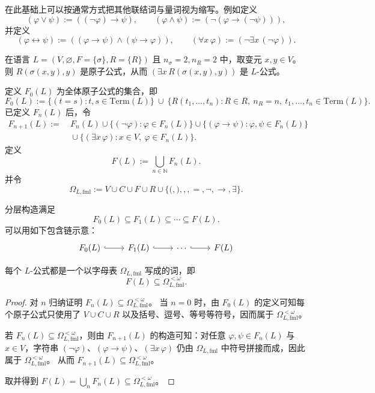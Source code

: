 \documentclass[lang=cn,a4paper,newtx,section]{elegantbook}
\begin{document}
\begin{remark}
在此基础上可以按通常方式把其他联结词与量词视为缩写。例如定义
\[
  (\varphi\vee\psi):=((\neg\varphi)\to\psi),\qquad (\varphi\wedge\psi):=(\neg(\varphi\to(\neg\psi))),
\]
并定义
\[
  (\varphi\leftrightarrow\psi):=((\varphi\to\psi)\wedge(\psi\to\varphi)),\qquad (\forall x\,\varphi):=(\neg\exists x\,(\neg\varphi)).
\]
\end{remark}

\begin{example}
在语言 $L=(V,\varnothing,F=\{\sigma\},R=\{R\})$ 且 $n_{\sigma}=2,n_R=2$ 中，取变元 $x,y\in V$。
则 $R(\sigma(x,y),y)$ 是原子公式，从而 $(\exists x\,R(\sigma(x,y),y))$ 是 $L$-公式。
\end{example}
 
 \begin{definition}[$F_n(L)$ 与 $F(L)$]
 定义 $F_0(L)$ 为全体原子公式的集合，即
 \[
   F_0(L):=\{(t=s): t,s\in\mathrm{Term}(L)\}\ \cup\ \{R(t_1,\dots,t_n): R\in R,\ n_R=n,\ t_1,\dots,t_n\in\mathrm{Term}(L)\}.
 \]
 已定义 $F_n(L)$ 后，令
 \[
   \begin{aligned}
   F_{n+1}(L):=&\ F_n(L)
   \cup\{(\neg\varphi):\varphi\in F_n(L)\}
   \cup\{(\varphi\to\psi):\varphi,\psi\in F_n(L)\}\\
   &\ \cup\{(\exists x\,\varphi): x\in V,\ \varphi\in F_n(L)\}.
   \end{aligned}
 \]
 定义
 \[
   F(L):=\bigcup_{n\in\mathbb N}F_n(L).
 \]
 并令
 \[
   \Omega_{L,\mathrm{fml}}:=V\cup C\cup F\cup R\cup\{\mathtt{(},\mathtt{)},\mathtt{,},\mathtt{=},\neg,\to,\exists\}.
 \]
 \end{definition}
 
 \begin{remark}
 分层构造满足
 \[
   F_0(L)\subseteq F_1(L)\subseteq\cdots\subseteq F(L).
 \]
 可以用如下包含链示意：
 \[
 \begin{tikzcd}
 F_0(L) \arrow[r, hook] & F_1(L) \arrow[r, hook] & \cdots \arrow[r, hook] & F(L)
 \end{tikzcd}
 \]
 \end{remark}
 
 \begin{lemma}
 每个 $L$-公式都是一个以字母表 $\Omega_{L,\mathrm{fml}}$ 写成的词，即
 \[
   F(L)\subseteq \Omega_{L,\mathrm{fml}}^{<\omega}.
 \]
 \end{lemma}
 
 \begin{proof}
 对 $n$ 归纳证明 $F_n(L)\subseteq\Omega_{L,\mathrm{fml}}^{<\omega}$。
 当 $n=0$ 时，由 $F_0(L)$ 的定义可知每个原子公式只使用了 $V\cup C\cup R$ 以及括号、逗号、等号等符号，因而属于 $\Omega_{L,\mathrm{fml}}^{<\omega}$。
 
 若 $F_n(L)\subseteq\Omega_{L,\mathrm{fml}}^{<\omega}$，则由 $F_{n+1}(L)$ 的构造可知：对任意 $\varphi,\psi\in F_n(L)$ 与 $x\in V$，字符串 $(\neg\varphi)$、$(\varphi\to\psi)$、$(\exists x\,\varphi)$ 仍由 $\Omega_{L,\mathrm{fml}}$ 中符号拼接而成，因此属于 $\Omega_{L,\mathrm{fml}}^{<\omega}$。
 从而 $F_{n+1}(L)\subseteq\Omega_{L,\mathrm{fml}}^{<\omega}$。
 
 取并得到 $F(L)=\bigcup_n F_n(L)\subseteq\Omega_{L,\mathrm{fml}}^{<\omega}$。
 \end{proof}
 
\end{document}
